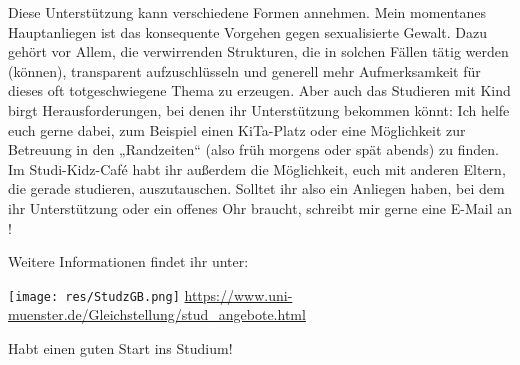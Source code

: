 \begin{multicols}{2}
Diese Unterstützung kann verschiedene Formen annehmen. Mein momentanes Hauptanliegen ist das konsequente Vorgehen gegen sexualisierte Gewalt. Dazu gehört vor Allem, die verwirrenden Strukturen, die in solchen Fällen tätig werden (können), transparent aufzuschlüsseln und generell mehr Aufmerksamkeit für dieses oft totgeschwiegene Thema zu erzeugen. 
Aber auch das Studieren mit Kind birgt Herausforderungen, bei denen ihr Unterstützung bekommen könnt: Ich helfe euch gerne dabei, zum Beispiel einen KiTa-Platz oder eine Möglichkeit zur Betreuung in den „Randzeiten“ (also früh morgens oder spät abends) zu finden. Im Studi-Kidz-Café habt ihr außerdem die Möglichkeit, euch mit anderen Eltern, die gerade studieren, auszutauschen. 
Solltet ihr also ein Anliegen haben, bei dem ihr Unterstützung oder ein offenes Ohr braucht, schreibt mir gerne eine E-Mail an ! 

Weitere Informationen findet ihr unter: 
\begin{center}
  \texttt{[image: res/StudzGB.png]}
  \smallskip
  \url{https://www.uni-muenster.de/Gleichstellung/stud\_angebote.html} 
\end{center}

Habt einen guten Start ins Studium!
 
 
\end{multicols}
